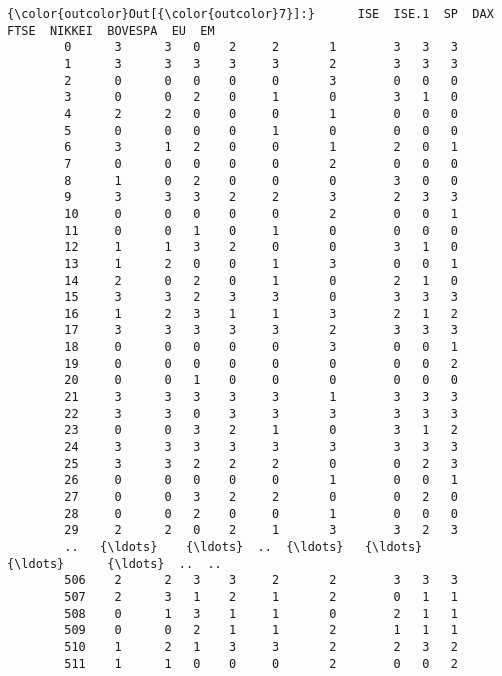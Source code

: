 \documentclass[11pt]{article}
\begin{document}
\begin{Verbatim}[commandchars=\\\{\}]
{\color{outcolor}Out[{\color{outcolor}7}]:}      ISE  ISE.1  SP  DAX  FTSE  NIKKEI  BOVESPA  EU  EM
        0      3      3   0    2     2       1        3   3   3
        1      3      3   3    3     3       2        3   3   3
        2      0      0   0    0     0       3        0   0   0
        3      0      0   2    0     1       0        3   1   0
        4      2      2   0    0     0       1        0   0   0
        5      0      0   0    0     1       0        0   0   0
        6      3      1   2    0     0       1        2   0   1
        7      0      0   0    0     0       2        0   0   0
        8      1      0   2    0     0       0        3   0   0
        9      3      3   3    2     2       3        2   3   3
        10     0      0   0    0     0       2        0   0   1
        11     0      0   1    0     1       0        0   0   0
        12     1      1   3    2     0       0        3   1   0
        13     1      2   0    0     1       3        0   0   1
        14     2      0   2    0     1       0        2   1   0
        15     3      3   2    3     3       0        3   3   3
        16     1      2   3    1     1       3        2   1   2
        17     3      3   3    3     3       2        3   3   3
        18     0      0   0    0     0       3        0   0   1
        19     0      0   0    0     0       0        0   0   2
        20     0      0   1    0     0       0        0   0   0
        21     3      3   3    3     3       1        3   3   3
        22     3      3   0    3     3       3        3   3   3
        23     0      0   3    2     1       0        3   1   2
        24     3      3   3    3     3       3        3   3   3
        25     3      3   2    2     2       0        0   2   3
        26     0      0   0    0     0       1        0   0   1
        27     0      0   3    2     2       0        0   2   0
        28     0      0   2    0     0       1        0   0   0
        29     2      2   0    2     1       3        3   2   3
        ..   {\ldots}    {\ldots}  ..  {\ldots}   {\ldots}     {\ldots}      {\ldots}  ..  ..
        506    2      2   3    3     2       2        3   3   3
        507    2      3   1    2     1       2        0   1   1
        508    0      1   3    1     1       0        2   1   1
        509    0      0   2    1     1       2        1   1   1
        510    1      2   1    3     3       2        2   3   2
        511    1      1   0    0     0       2        0   0   2

\end{Verbatim}
\end{document}
